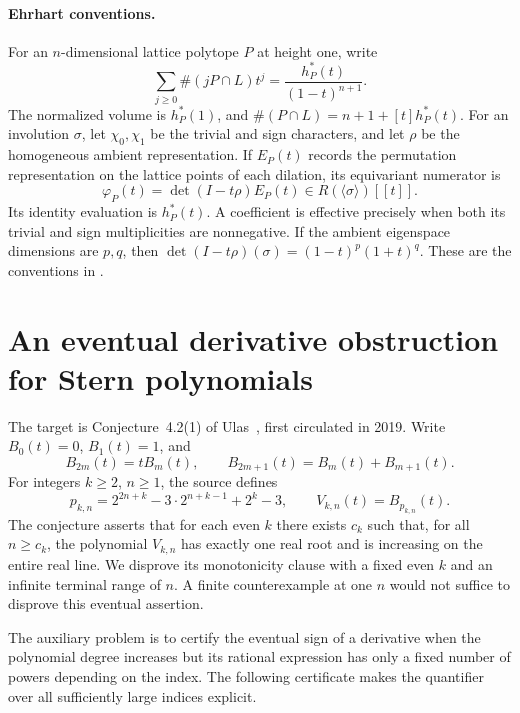 \documentclass[11pt,a4paper]{article}
\theoremstyle{definition}\newtheorem{definition}[lemma]{Definition}
\theoremstyle{remark}\newtheorem{remark}[lemma]{Remark}
\begin{document}
\paragraph{Ehrhart conventions.}
For an $n$-dimensional lattice polytope $P$ at height one, write
\[
 \sum_{j\geq0}\#(jP\cap L)t^j=\frac{h^*_P(t)}{(1-t)^{n+1}}.
\]
The normalized volume is $h^*_P(1)$, and
$\#(P\cap L)=n+1+[t]h^*_P(t)$. For an involution $\sigma$, let
$\chi_0,\chi_1$ be the trivial and sign characters, and let $\rho$ be the
homogeneous ambient representation. If $E_P(t)$ records the permutation
representation on the lattice points of each dilation, its equivariant
numerator is
\[
 \varphi_P(t)=\det(I-t\rho)E_P(t)
        \in R(\langle\sigma\rangle)[[t]].
\]
Its identity evaluation is $h^*_P(t)$. A coefficient is effective precisely
when both its trivial and sign multiplicities are nonnegative. If the
ambient eigenspace dimensions are $p,q$, then
$\det(I-t\rho)(\sigma)=(1-t)^p(1+t)^q$. These are the conventions in
\cite{Clarke26}.


\section{An eventual derivative obstruction for Stern polynomials}
\label{sec:ulas-obstruction}

The target is Conjecture~4.2(1) of Ulas~\cite{Ulas20}, first circulated in
2019. Write $B_0(t)=0$, $B_1(t)=1$, and
\[
 B_{2m}(t)=tB_m(t),\qquad B_{2m+1}(t)=B_m(t)+B_{m+1}(t).
\]
For integers $k\geq2$, $n\geq1$, the source defines
\[
 p_{k,n}=2^{2n+k}-3\cdot2^{n+k-1}+2^k-3,
 \qquad V_{k,n}(t)=B_{p_{k,n}}(t).
\]
The conjecture asserts that for each even $k$ there exists $c_k$ such that,
for all $n\geq c_k$, the polynomial $V_{k,n}$ has exactly one real root and
is increasing on the entire real line. We disprove its monotonicity clause
with a fixed even $k$ and an infinite terminal range of $n$. A finite
counterexample at one $n$ would not suffice to disprove this eventual
assertion.

The auxiliary problem is to certify the eventual sign of a derivative when
the polynomial degree increases but its rational expression has only a fixed
number of powers depending on the index. The following certificate makes
the quantifier over all sufficiently large indices explicit.
\end{document}
